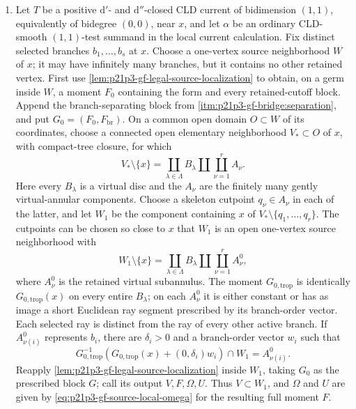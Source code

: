 \begin{proposition}
\begin{enumerate}
\item\label{itm:p21p3-gf-bridge:localization}
Let \(T\) be a positive \(\mathrm d'\)- and \(\mathrm d''\)-closed CLD
current of bidimension \((1,1)\), equivalently of bidegree \((0,0)\), near
\(x\), and let \(\alpha\) be an ordinary CLD-smooth \((1,1)\)-test summand
in the local current calculation.  Fix distinct selected branches
\(b_1,\ldots,b_s\) at \(x\).  Choose a one-vertex source neighborhood
\(W\) of \(x\); it may have
infinitely many branches, but it contains no other retained vertex.  First use
\cref{lem:p21p3-gf-legal-source-localization} to obtain, on a germ inside
\(W\), a moment \(F_0\) containing the form and every retained-cutoff block.
Append the branch-separating block from
\cref{itm:p21p3-gf-bridge:separation}, and put
\(G_0=(F_0,F_{\mathrm{br}})\).  On a common open domain \(O\subset W\) of
its coordinates, choose a connected open elementary neighborhood
\(V_*\subset O\) of \(x\), with compact-tree closure, for which
\[
 V_*\setminus\{x\}
   =\coprod_{\lambda\in\Lambda}B_\lambda
      \amalg\coprod_{\nu=1}^{r}A_\nu .
\]
Here every \(B_\lambda\) is a virtual disc and the \(A_\nu\) are the
finitely many gently virtual-annular components.  Choose a skeleton cutpoint
\(q_\nu\in A_\nu\) in each of the latter, and let \(W_1\) be the component
containing \(x\) of
\(V_*\setminus\{q_1,\ldots,q_r\}\).  The cutpoints can be chosen so close to
\(x\) that \(W_1\) is an open one-vertex source neighborhood with
\[
 W_1\setminus\{x\}
   =\coprod_{\lambda\in\Lambda}B_\lambda
      \amalg\coprod_{\nu=1}^{r}A_\nu^0,
\]
where \(A_\nu^0\) is the retained virtual subannulus.  The moment
\(G_{0,\mathrm{trop}}\) is identically \(G_{0,\mathrm{trop}}(x)\) on every
entire \(B_\lambda\); on each \(A_\nu^0\) it is either constant or has as
image a short Euclidean ray segment prescribed by its branch-order vector.
Each selected ray is distinct from the ray of every other active branch.
If \(A_{\nu(i)}^0\) represents \(b_i\), there are \(\delta_i>0\) and a
branch-order vector \(w_i\) such that
\begin{equation}
 G_{0,\mathrm{trop}}^{-1}\!\left(
   G_{0,\mathrm{trop}}(x)+(0,\delta_i)w_i\right)\cap W_1
   =A_{\nu(i)}^0.
 \label{eq:p21p3-gf-preliminary-exact-source-locator}
\end{equation}
Reapply
\cref{lem:p21p3-gf-legal-source-localization} inside \(W_1\), taking \(G_0\)
as the prescribed block \(G\); call its output \(V,F,\Omega,U\).  Thus
\(V\subset W_1\), and \(\Omega\) and \(U\) are given by
\eqref{eq:p21p3-gf-source-local-omega} for the resulting full moment \(F\).


\end{enumerate}
\end{proposition}
